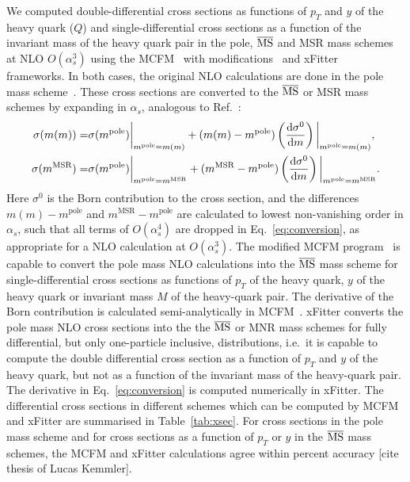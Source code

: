 \documentclass[12pt,a4paper]{article}
\newcommand{\msbar}{\ensuremath{\overline{\rm MS}}\xspace}
\begin{document}
We computed double-differential cross sections as functions of $p_T$ and $y$ of the heavy quark ($Q$) and single-differential cross sections as a function of the invariant mass of the heavy quark pair in the pole, \msbar and MSR mass schemes at NLO $O(\alpha_s^3)$ using the MCFM~\cite{Campbell:1999ah,Campbell:2011bn} with modifications~\cite{Dowling:2013baa} and xFitter~\cite{Alekhin:2014irh} frameworks. In both cases, the original NLO calculations are done in the pole mass scheme~\cite{Mangano:1991jk}. These cross sections are converted to the \msbar or MSR mass schemes by expanding in $\alpha_s$, analogous to Ref.~\cite{Dowling:2013baa}:
\begin{equation}
\begin{aligned}
\sigma(m(m)) =& \sigma(m^{\text{pole}})\bigg|_{m^{\text{pole}}=m(m)} + (m(m) - m^{\text{pole}})\left(\frac{{\rm d}\sigma^0}{{\rm d}m}\right)\bigg|_{m^{\text{pole}}=m(m)},\\
\sigma(m^{\text{MSR}}) =& \sigma(m^{\text{pole}})\bigg|_{m^{\text{pole}}=m^{\text{MSR}}} + (m^{\text{MSR}} - m^{\text{pole}})\left(\frac{{\rm d}\sigma^0}{{\rm d}m}\right)\bigg|_{m^{\text{pole}}=m^{\text{MSR}}}.
\end{aligned}
\label{eq:conversion}
\end{equation}
Here $\sigma^0$ is the Born contribution to the cross section, and the differences $m(m) - m^{\text{pole}}$ and $m^{\text{MSR}} - m^{\text{pole}}$ are calculated to lowest non-vanishing  order in $\alpha_s$, such that all terms of $O(\alpha_s^4)$ are dropped in Eq.~\ref{eq:conversion}, as appropriate for a NLO calculation at $O(\alpha_s^3)$. The modified MCFM program~\cite{Dowling:2013baa} is capable to convert the pole mass NLO calculations into the \msbar mass scheme for single-differential cross sections as functions of $p_T$ of the heavy quark, $y$ of the heavy quark or invariant mass $M$ of the heavy-quark pair. The derivative of the Born contribution is calculated semi-analytically in MCFM~\cite{Dowling:2013baa}. xFitter converts the pole mass NLO cross sections into the the \msbar or MNR mass schemes for fully differential, but only one-particle inclusive, distributions, i.e.\ it is capable to compute the double differential cross section as a function of $p_T$ and $y$ of the heavy quark, but not as a function of the invariant mass of the heavy-quark pair. The derivative in Eq.~\ref{eq:conversion} is computed numerically in xFitter. The differential cross sections in different schemes which can be computed by MCFM and xFitter are summarised in Table~\ref{tab:xsec}. For cross sections in the pole mass scheme and for cross sections as a function of $p_T$ or $y$ in the \msbar mass schemes, the MCFM and xFitter calculations agree within percent accuracy [cite thesis of Lucas Kemmler].%
\end{document}
